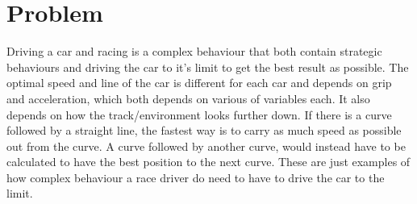 



\section{Problem}
Driving a car and racing is a complex behaviour that both contain strategic behaviours and driving the car to it's limit to get the best result as possible. The optimal speed and line of the car is different for each car and depends on grip and acceleration, which both depends on various of variables each. It also depends on how the track/environment looks further down. If there is a curve followed by a straight line, the fastest way is to carry as much speed as possible out from the curve. A curve followed by another curve, would instead have to be calculated to have the best position to the next curve. These are just examples of how complex behaviour a race driver do need to have to drive the car to the limit.

